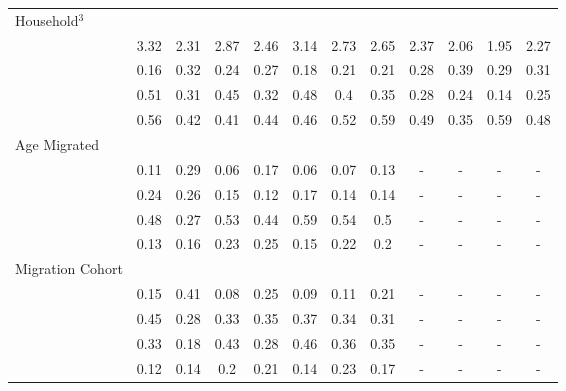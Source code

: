 \documentclass[
]{article}
\begin{document}
\begin{landscape}
\begin{table}[ht]
\begin{threeparttable}
\begin{tabular}{>{\raggedright\arraybackslash}p{3.2cm}|lcccccc|cccc}
  Household$^3$ &  &  &  &  &  &  &  &  &  &  &  \\ 
  \multicolumn{1}{>{\raggedleft\arraybackslash}p{2.7cm}|}{\makebox[2.7cm][r]{Household Size }}& 3.32 & 2.31 & 2.87 & 2.46 & 3.14 & 2.73 & 2.65 & 2.37 & 2.06 & 1.95 & 2.27 \\ 
  \multicolumn{1}{>{\raggedleft\arraybackslash}p{2.2cm}|}{\makebox[2.2cm][r]{Lives Alone }}& 0.16 & 0.32 & 0.24 & 0.27 & 0.18 & 0.21 & 0.21 & 0.28 & 0.39 & 0.29 & 0.31 \\ 
  \multicolumn{1}{>{\raggedleft\arraybackslash}p{2.9cm}|}{\makebox[2.9cm][r]{Lives with Child }}& 0.51 & 0.31 & 0.45 & 0.32 & 0.48 & 0.4 & 0.35 & 0.28 & 0.24 & 0.14 & 0.25 \\ 
  \multicolumn{1}{>{\raggedleft\arraybackslash}p{3.4cm}|}{\makebox[3.4cm][r]{Married/Cohabiting }}& 0.56 & 0.42 & 0.41 & 0.44 & 0.46 & 0.52 & 0.59 & 0.49 & 0.35 & 0.59 & 0.48 \\ 
  Age Migrated &  &  &  &  &  &  &  &  &  &  &  \\ 
  \multicolumn{1}{>{\raggedleft\arraybackslash}p{2.4cm}|}{\makebox[2.4cm][r]{Less than 15 }}& 0.11 & 0.29 & 0.06 & 0.17 & 0.06 & 0.07 & 0.13 & - & - & - & - \\ 
  \multicolumn{1}{>{\raggedleft\arraybackslash}p{1.6cm}|}{\makebox[1.6cm][r]{15 - 23 }}& 0.24 & 0.26 & 0.15 & 0.12 & 0.17 & 0.14 & 0.14 & - & - & - & - \\ 
  \multicolumn{1}{>{\raggedleft\arraybackslash}p{1.6cm}|}{\makebox[1.6cm][r]{24 - 49 }}& 0.48 & 0.27 & 0.53 & 0.44 & 0.59 & 0.54 & 0.5 & - & - & - & - \\ 
  \multicolumn{1}{>{\raggedleft\arraybackslash}p{2.6cm}|}{\makebox[2.6cm][r]{50 and Above }}& 0.13 & 0.16 & 0.23 & 0.25 & 0.15 & 0.22 & 0.2 & - & - & - & - \\ 
  Migration Cohort &  &  &  &  &  &  &  &  &  &  &  \\ 
  \multicolumn{1}{>{\raggedleft\arraybackslash}p{2.3cm}|}{\makebox[2.3cm][r]{Before 1965 }}& 0.15 & 0.41 & 0.08 & 0.25 & 0.09 & 0.11 & 0.21 & - & - & - & - \\ 
  \multicolumn{1}{>{\raggedleft\arraybackslash}p{2.2cm}|}{\makebox[2.2cm][r]{1965 - 1979 }}& 0.45 & 0.28 & 0.33 & 0.35 & 0.37 & 0.34 & 0.31 & - & - & - & - \\ 
  \multicolumn{1}{>{\raggedleft\arraybackslash}p{2.2cm}|}{\makebox[2.2cm][r]{1980 - 1999 }}& 0.33 & 0.18 & 0.43 & 0.28 & 0.46 & 0.36 & 0.35 & - & - & - & - \\ 
  \multicolumn{1}{>{\raggedleft\arraybackslash}p{2.1cm}|}{\makebox[2.1cm][r]{After 1999 }}& 0.12 & 0.14 & 0.2 & 0.21 & 0.14 & 0.23 & 0.17 & - & - & - & - \\ 

\end{tabular}
\end{threeparttable}
\end{table}
\end{landscape}
\end{document}
